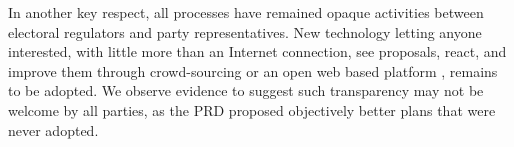 \documentclass[letter,12pt]{article}
\begin{document}



In another key respect, all processes have remained opaque activities between electoral regulators and party representatives. New technology letting anyone interested, with little more than an Internet connection, see proposals, react, and improve them through crowd-sourcing or an open web based platform \citep{altman.mcdonald2011bard,Trelles.2015}, remains to be adopted. We observe evidence to suggest such transparency may not be welcome by all parties, as the PRD proposed objectively better plans that were never adopted.



\end{document}
